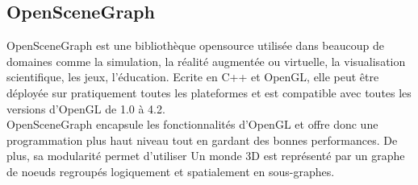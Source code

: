 \subsection{OpenSceneGraph}

OpenSceneGraph est une bibliothèque opensource utilisée dans beaucoup de domaines comme la simulation, la réalité augmentée ou virtuelle, la visualisation scientifique, les jeux, l'éducation. Ecrite en C++ et OpenGL, elle peut être déployée sur pratiquement toutes les plateformes et est compatible avec toutes les versions d'OpenGL de 1.0 à 4.2. \\
OpenSceneGraph encapsule les fonctionnalités d'OpenGL et offre donc une programmation plus haut niveau tout en gardant des bonnes performances. De plus, sa modularité permet d'utiliser 
Un monde 3D est représenté par un graphe de noeuds regroupés logiquement et spatialement en sous-graphes. 